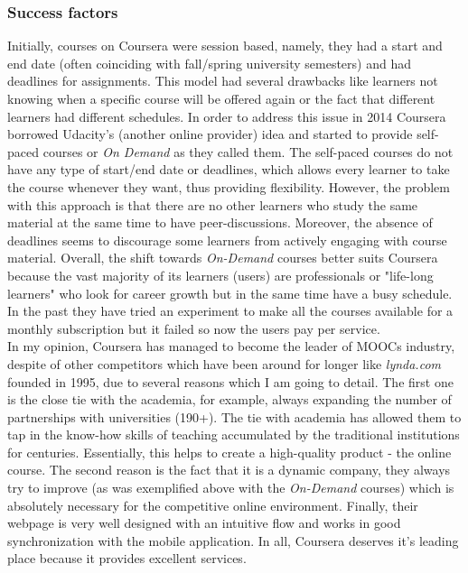 \documentclass[11]{article}
\begin{document}
\subsubsection{Success factors}
	\indent
	Initially, courses on Coursera were session based, namely, they had a start and end date (often coinciding with fall/spring university semesters) and had deadlines for assignments. This model had several drawbacks like learners not knowing when a specific course will be offered again or the fact that different learners had different schedules. In order to address this issue in 2014 Coursera borrowed Udacity's (another online provider) idea and started to provide self-paced courses or \textit{On Demand} as they called them. The self-paced courses do not have any type of start/end date or deadlines, which allows every learner to take the course whenever they want, thus providing flexibility.  However, the problem with this approach is that there are no other learners who study the same material at the same time to have peer-discussions. Moreover, the absence of deadlines seems to discourage some learners from actively engaging with course material. Overall, the shift towards \textit{On-Demand} courses better suits Coursera because  the vast majority of its learners (users)  are professionals or "life-long learners" who look for career growth but in the same time have a busy schedule. In the past they have tried an experiment to make all the courses available for a monthly subscription but it failed so now the users pay per service.\\ 
	\indent
	In my opinion, Coursera has managed to become the leader of MOOCs industry, despite of other competitors which have been around for longer like \textit{lynda.com} founded in 1995, due to several reasons which I am going to detail. The first one  is the close tie with the academia, for example, always expanding the number of partnerships with universities (190+). The tie with academia has allowed them to tap in the know-how skills of teaching accumulated by the traditional institutions for centuries. Essentially, this helps to create a high-quality product - the online course. The second reason is the fact that it is a dynamic company, they always try to improve (as was exemplified above with the \textit{On-Demand} courses) which is absolutely necessary for the competitive online environment. Finally, their webpage is very well designed with an intuitive flow and works in good synchronization with the mobile application. In all, Coursera deserves it's leading place because it provides excellent services. 
\end{document}
